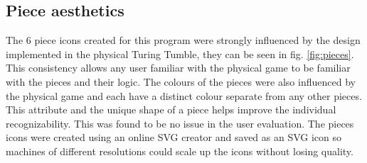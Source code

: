 \documentclass{l4proj}
\begin{document}
\subsection{Piece aesthetics}
The 6 piece icons created for this program were strongly influenced by the design implemented in the physical Turing Tumble, they can be seen in fig. \ref{fig:pieces}. This consistency allows any user familiar with the physical game to be familiar with the pieces and their logic. The colours of the pieces were also influenced by the physical game and each have a distinct colour separate from any other pieces. This attribute and the unique shape of a piece helps improve the individual recognizability. This was found to be no issue in the user evaluation. The pieces icons were created using an online SVG creator \citep{noauthor_method_nodate} and saved as an SVG icon so machines of different resolutions could scale up the icons without losing quality. 
\end{document}
